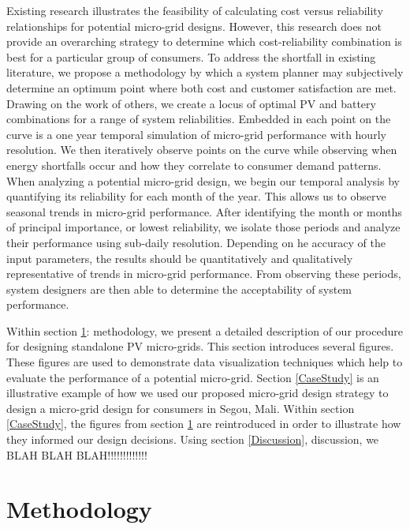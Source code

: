 \documentclass[11p]{article}
\begin{document}
Existing research illustrates the feasibility of calculating cost versus reliability relationships for potential micro-grid designs.
However, this research does not provide an overarching strategy to determine which cost-reliability combination is best for a particular group of consumers.  
To address the shortfall in existing literature, we propose a methodology by which a system planner may subjectively determine an optimum point where both cost and customer satisfaction are met.
Drawing on the work of others, we create a locus of optimal PV and battery combinations for a range of system reliabilities.
Embedded in each point on the curve is a one year temporal simulation of micro-grid performance with hourly resolution.  
We then iteratively observe points on the curve while observing when energy shortfalls occur and how they correlate to consumer demand patterns.
When analyzing a potential micro-grid design, we begin our temporal analysis by quantifying its reliability for each month of the year. 
This allows us to observe seasonal trends in micro-grid performance. 
After identifying the month or months of principal importance, or lowest reliability, we isolate those periods and analyze their performance using sub-daily resolution. 
Depending on he accuracy of the input parameters, the results should be quantitatively and qualitatively representative of trends in micro-grid performance. 
From observing these periods, system designers are then able to determine the acceptability of system performance.


Within section \ref{method}: methodology, we present a detailed description of our procedure for designing standalone PV micro-grids. 
This section introduces several figures.
These figures are used to demonstrate data visualization techniques which help to evaluate the performance of a potential micro-grid.  
Section \ref{CaseStudy} is an illustrative example of how we used our proposed micro-grid design strategy to design a micro-grid design for consumers in Segou, Mali. 
Within section \ref{CaseStudy}, the figures from section \ref{method} are reintroduced in order to illustrate how they informed our design decisions.
Using section \ref{Discussion}, discussion, we BLAH BLAH BLAH!!!!!!!!!!!!!


\section{Methodology} \label{method}

\end{document}
